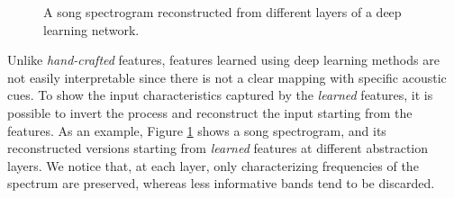\begin{figure}[t]
\captionsetup[subfigure]{justification=centering}
	\centering
       \hfil
      \caption{A song spectrogram reconstructed from different layers of a deep learning network.}
      \label{fig:LLFs:features}          
\end{figure}


Unlike \textit{hand-crafted} features, features learned using deep learning methods are not easily interpretable since there is not a clear mapping with specific acoustic cues. To show the input characteristics captured by the \textit{learned} features, it is possible to invert the process and reconstruct the input starting from the features. As an example, Figure \ref{fig:LLFs:features} shows a song spectrogram, and its reconstructed versions starting from \textit{learned} features at different abstraction layers. We notice that, at each layer, only characterizing frequencies of the spectrum are preserved, whereas less informative bands tend to be discarded.

